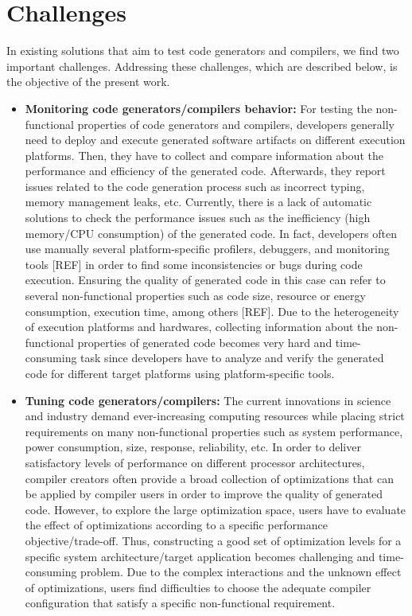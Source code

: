 \section{Challenges}
In existing solutions that aim to test code generators and compilers, we find two important challenges. Addressing these challenges, which are described below, is the objective of the present work.
\begin{itemize}
\item
\textbf{Monitoring code generators/compilers behavior:} For testing the non-functional properties of code generators and compilers, developers generally need to deploy and execute generated software artifacts on different execution platforms. Then, they have to collect and compare information about the performance and efficiency of the generated code. Afterwards, they report issues related to the code generation process such as incorrect typing, memory management leaks, etc. Currently, there is a lack of automatic solutions to check the performance issues such as the inefficiency (high memory/CPU consumption) of the generated code. In fact, developers often use manually several platform-specific profilers, debuggers, and monitoring tools [REF] in order to find some inconsistencies or bugs during code execution. Ensuring the quality of generated code in this case can refer to several non-functional properties such as code size, resource or energy consumption, execution time, among others [REF]. Due to the heterogeneity of execution platforms and hardwares, collecting information about the non-functional properties of generated code becomes very hard and time-consuming task since developers have to analyze and verify the generated code for different target platforms using platform-specific tools.
\item
\textbf{Tuning code generators/compilers:} The current innovations in science and industry demand ever-increasing computing resources while placing strict requirements on many non-functional properties such as system performance, power consumption, size, response, reliability, etc. In order to deliver satisfactory levels of performance on different processor architectures, compiler creators often provide a broad collection of optimizations that can be applied by compiler users in order to improve the quality of generated code. However, to explore the large optimization space, users have to evaluate the effect of optimizations according to a specific performance objective/trade-off. Thus, constructing a good set of optimization levels for a specific system architecture/target application becomes challenging and time-consuming problem. Due to the complex interactions and the unknown effect of optimizations, users find difficulties to choose the adequate compiler configuration that satisfy a specific non-functional requirement.





 


\end{itemize}
